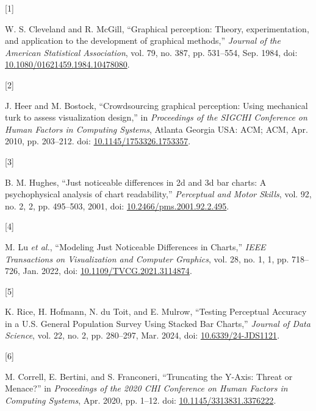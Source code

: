 \documentclass{IEEEcsmag}
\newlength{\cslhangindent}
\newlength{\csllabelwidth}
\newenvironment{CSLReferences}[2] %
 {\begin{list}{}{%
  \setlength{\itemindent}{0pt}
  \setlength{\leftmargin}{0pt}
  \setlength{\parsep}{0pt}
  \ifodd #1
   \setlength{\leftmargin}{\cslhangindent}
   \setlength{\itemindent}{-1\cslhangindent}
  \fi
  \setlength{\itemsep}{#2\baselineskip}}}
 {\end{list}}
\newcommand{\CSLLeftMargin}[1]{\parbox[t]{\csllabelwidth}{#1}}
\newcommand{\CSLRightInline}[1]{\parbox[t]{\linewidth - \csllabelwidth}{#1}\break}
\begin{document}
\label{refs}
\begin{CSLReferences}{0}{0}
\CSLLeftMargin{{[}1{]} }%
\CSLRightInline{W. S. Cleveland and R. McGill, {``Graphical perception: {Theory}, experimentation, and application to the development of graphical methods,''} \emph{Journal of the American Statistical Association}, vol. 79, no. 387, pp. 531--554, Sep. 1984, doi: \href{https://doi.org/10.1080/01621459.1984.10478080}{10.1080/01621459.1984.10478080}.}

\CSLLeftMargin{{[}2{]} }%
\CSLRightInline{J. Heer and M. Bostock, {``Crowdsourcing graphical perception: Using mechanical turk to assess visualization design,''} in \emph{Proceedings of the {SIGCHI Conference} on {Human Factors} in {Computing Systems}}, Atlanta Georgia USA: ACM; ACM, Apr. 2010, pp. 203--212. doi: \href{https://doi.org/10.1145/1753326.1753357}{10.1145/1753326.1753357}.}

\CSLLeftMargin{{[}3{]} }%
\CSLRightInline{B. M. Hughes, {``Just noticeable differences in 2d and 3d bar charts: {A} psychophysical analysis of chart readability,''} \emph{Perceptual and Motor Skills}, vol. 92, no. 2, 2, pp. 495--503, 2001, doi: \href{https://doi.org/10.2466/pms.2001.92.2.495}{10.2466/pms.2001.92.2.495}.}

\CSLLeftMargin{{[}4{]} }%
\CSLRightInline{M. Lu \emph{et al.}, {``Modeling {Just Noticeable Differences} in {Charts},''} \emph{IEEE Transactions on Visualization and Computer Graphics}, vol. 28, no. 1, 1, pp. 718--726, Jan. 2022, doi: \href{https://doi.org/10.1109/TVCG.2021.3114874}{10.1109/TVCG.2021.3114874}.}

\CSLLeftMargin{{[}5{]} }%
\CSLRightInline{K. Rice, H. Hofmann, N. du Toit, and E. Mulrow, {``Testing {Perceptual Accuracy} in a {U}.{S}. {General Population Survey Using Stacked Bar Charts},''} \emph{Journal of Data Science}, vol. 22, no. 2, pp. 280--297, Mar. 2024, doi: \href{https://doi.org/10.6339/24-JDS1121}{10.6339/24-JDS1121}.}

\CSLLeftMargin{{[}6{]} }%
\CSLRightInline{M. Correll, E. Bertini, and S. Franconeri, {``Truncating the {Y-Axis}: {Threat} or {Menace}?''} in \emph{Proceedings of the 2020 {CHI Conference} on {Human Factors} in {Computing Systems}}, Apr. 2020, pp. 1--12. doi: \href{https://doi.org/10.1145/3313831.3376222}{10.1145/3313831.3376222}.}


\end{CSLReferences}
\end{document}
